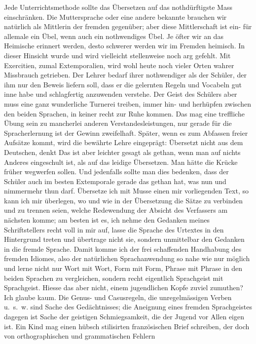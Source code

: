 Jede Unterrichtsmethode sollte das Übersetzen auf das nothdürftigste Mass einschränken. Die Muttersprache oder eine andere bekannte brauchen wir na\-\label{sp.72}türlich als Mittlerin der fremden gegenüber; aber diese Mittlerschaft ist ein- für allemale ein Übel, wenn auch ein nothwendiges Übel. Je öfter wir an das Heimische erinnert werden, desto schwerer werden wir im Fremden heimisch. In dieser Hinsicht wurde und wird vielleicht stellenweise noch arg gefehlt.  Mit Exercitien, zumal Extemporalien, wird wohl heute noch vieler Orten wahrer Missbrauch getrieben. Der Lehrer bedarf ihrer nothwendiger als der Schüler, der ihm nur den Beweis liefern soll, dass er die gelernten Regeln und Vocabeln gut inne habe und schlagfertig anzuwenden verstehe. Der Geist des Schülers aber muss eine ganz wunderliche Turnerei treiben, immer hin- und herhüpfen zwischen den beiden Sprachen, in keiner recht zur Ruhe kommen. Das mag eine treffliche Übung sein zu mancherlei anderen Verstandesleistungen, nur gerade für die Spracherlernung ist der Gewinn zweifelhaft. Später, wenn es zum Abfassen freier Aufsätze kommt, wird die bewährte Lehre eingeprägt: Übersetzt nicht aus dem Deutschen, denkt  Das ist aber leichter gesagt als gethan, wenn man auf nichts Anderes eingeschult ist, als auf das leidige Übersetzen. Man hätte die Krücke früher wegwerfen sollen. Und jedenfalls sollte man dies bedenken, dass der Schüler auch im besten Extemporale gerade das gethan hat, was  nun und nimmermehr thun darf. Übersetze ich mit Musse einen mir vorliegenden Text, so kann ich mir \label{fp.74} überlegen, wo und wie in der Übersetzung die Sätze zu verbinden und zu trennen seien, welche Redewendung der Absicht des Verfassers am nächsten komme; am besten ist es, ich nehme den Gedanken meines Schriftstellers recht voll in mir auf, lasse die Sprache des Urtextes in den Hintergrund treten und übertrage nicht sie, sondern unmittelbar den Gedanken in die fremde Sprache. Damit komme ich der frei schaffenden Handhabung des fremden Idiomes, also der natürlichen Sprachanwendung so nahe wie nur möglich und lerne nicht nur Wort mit Wort, Form mit Form, Phrase mit Phrase in den beiden Sprachen zu vergleichen, sondern recht eigentlich Sprachgeist mit Sprachgeist. Hiesse das aber nicht, einem jugendlichen Kopfe zuviel zumuthen? Ich glaube kaum. Die Genus- und Casusregeln, die unregelmässigen Verben u.~s.~w. sind Sache des Gedächtnisses; die Aneignung eines fremden Sprachgeistes dagegen ist Sache der geistigen Schmiegsamkeit, die der Jugend vor Allen eigen ist. Ein Kind mag einen hübsch stilisirten französischen Brief schreiben, der doch von orthographischen und grammatischen Fehlern 